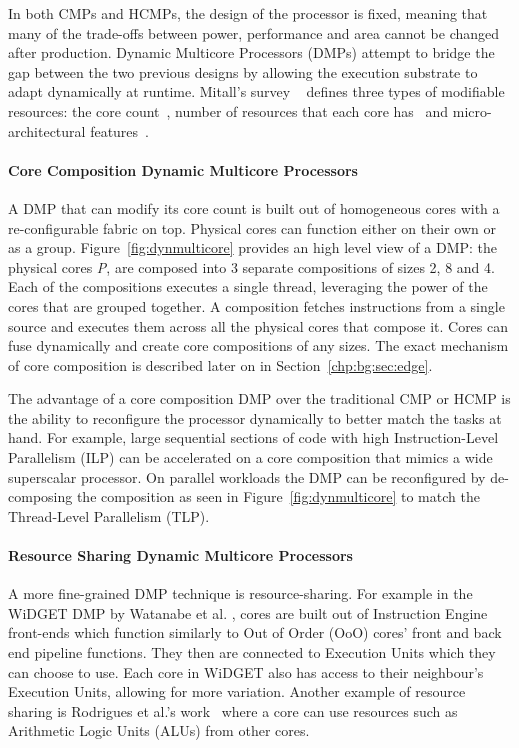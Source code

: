 In both CMPs and HCMPs, the design of the processor is fixed, meaning that many of the trade-offs between power, performance and area cannot be changed after production.
Dynamic Multicore Processors (DMPs) attempt to bridge the gap between the two previous designs by allowing the execution substrate to adapt dynamically at runtime.
Mitall's survey ~\cite{MittalSurv2016} defines three types of modifiable resources: the core count~\cite{ipek2007CoreFusion,kim2007tflex,pricopi2012bahurupi}, number of resources that each core has~\cite{Homayoun3DPooling2012} and micro-architectural features~\cite{fallinhetblock2014,BauerRSE08,tavanaElastic}.

\paragraph*{Core Composition Dynamic Multicore Processors}


A DMP that can modify its core count is built out of homogeneous cores with a re-configurable fabric on top.
Physical cores can function either on their own or as a group.
Figure~\ref{fig:dynmulticore} provides an high level view of a DMP: the physical cores \textit{P}, are composed into 3 separate compositions of sizes 2, 8 and 4.
Each of the compositions executes a single thread, leveraging the power of the cores that are grouped together.
A composition fetches instructions from a single source and executes them across all the physical cores that compose it.
Cores can fuse dynamically and create core compositions of any sizes.
The exact mechanism of core composition is described later on in Section~\ref{chp:bg:sec:edge}.

The advantage of a core composition DMP over the traditional CMP or HCMP is the ability to reconfigure the processor dynamically to better match the tasks at hand.
For example, large sequential sections of code with high Instruction-Level Parallelism (ILP) can be accelerated on a core composition that mimics a wide superscalar processor.
On parallel workloads the DMP can be reconfigured by de-composing the composition as seen in Figure~\ref{fig:dynmulticore} to match the Thread-Level Parallelism (TLP).

\paragraph*{Resource Sharing Dynamic Multicore Processors}
A more fine-grained DMP technique is resource-sharing.
For example in the WiDGET DMP by Watanabe et al. \cite{Watanabe2010Widget}, cores are built out of Instruction Engine front-ends which function similarly to Out of Order (OoO) cores' front and back end pipeline functions.
They then are connected to Execution Units which they can choose to use.
Each core in WiDGET also has access to their neighbour's Execution Units, allowing for more variation.
Another example of resource sharing is Rodrigues et al.'s work~\cite{rodrigues2014perf} where a core can use resources such as Arithmetic Logic Units (ALUs) from other cores.

